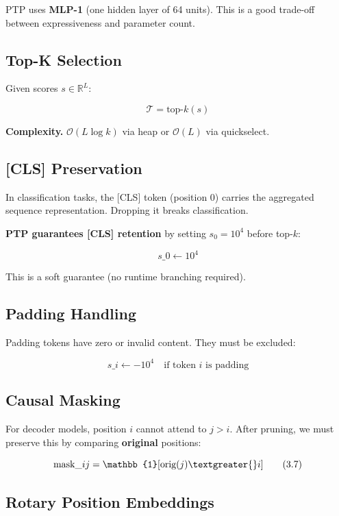 PTP uses \textbf{MLP-1} (one hidden layer of 64 units). This is a good 
trade-off between expressiveness and parameter count.

\subsection{Top-K Selection}

Given scores $s \in \mathbb{R}^L$:

\[
\mathcal{T} = \text{top-}k(s)
\tag{3.4}
\]

\textbf{Complexity.} $\mathcal{O}(L \log k)$ via heap or $\mathcal{O}(L)$ via 
quickselect.

\subsection{[CLS] Preservation}

In classification tasks, the [CLS] token (position 0) carries the 
aggregated sequence representation. Dropping it breaks classification.

\textbf{PTP guarantees [CLS] retention} by setting $s_0 = 10^4$ before top-$k$:

\[
s\_0 \leftarrow 10^4
\tag{3.5}
\]

This is a soft guarantee (no runtime branching required).

\subsection{Padding Handling}

Padding tokens have zero or invalid content. They must be excluded:

\[
s\_i \leftarrow -10^4 \quad \text{if token } i \text{ is padding}
\tag{3.6}
\]

\subsection{Causal Masking}

For decoder models, position $i$ cannot attend to $j > i$. After pruning, 
we must preserve this by comparing \textbf{original} positions:

\[
\text{mask}\_{ij} = \mathbb{1}[\text{orig}(j) \textgreater{} i]
\tag{3.7}
\]

\subsection{Rotary Position Embeddings}

